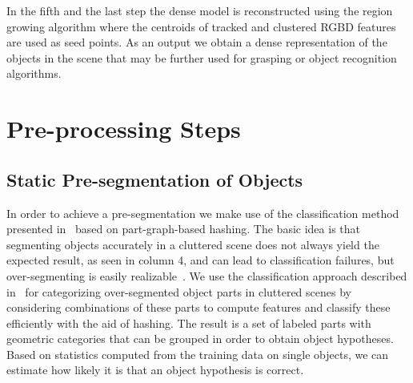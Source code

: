  In the fifth and the last step the dense model is reconstructed using the region growing algorithm 
where the centroids of tracked and clustered RGBD features are
used as seed points. As an output we obtain a dense representation of the objects in the scene that may be further used for grasping or object recognition algorithms.

\section{Pre-processing Steps}


\subsection{Static Pre-segmentation of Objects}
\label{sec:static-seg}

In order to achieve a pre-segmentation we make use of the classification method presented 
in~\cite{marton12SC} based on part-graph-based hashing.
The basic idea is that segmenting objects accurately 
in a cluttered scene does not always yield the expected result, as seen in %
column 4, and can lead to classification failures, 
but over-segmenting is easily realizable~\cite{soupofsegments,Lai_Fox_2010,mozos11furniture}. 
We use the classification approach described in~\cite{marton12SC} 
for categorizing over-segmented object parts in cluttered scenes
by considering combinations of these parts to compute features
and classify these efficiently with the aid of hashing.
The result is a set of labeled parts with geometric categories
that can be grouped in order to obtain object hypotheses.
Based on statistics computed from the training data on single objects, 
we can estimate how likely it is that an object hypothesis is
correct.


